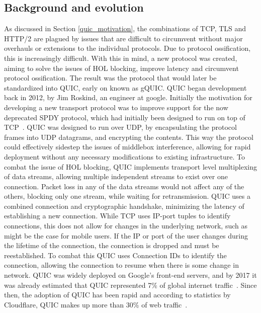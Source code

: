 \documentclass[english, 12pt, a4paper, elec, utf8, a-2b, online]{aaltothesis}
\begin{document}
\subsection{Background and evolution}
As discussed in Section \ref{quic_motivation}, the combinations of TCP, TLS and HTTP/2 are
plagued by issues that are difficult to circumvent without major overhauls or extensions to
the individual protocols. Due to protocol ossification, this is increasingly difficult. With
this in mind, a new protocol was created, aiming to solve the issues of
HOL blocking, improve latency and circumvent protocol ossification. The result
was the protocol that would later be standardized into QUIC, early on known as gQUIC.
QUIC began development back in 2012, by Jim Roskind, an engineer at google. Initially
the motivation for developing a new transport protocol was to improve support for
the now deprecated SPDY protocol, which had initially been designed to run on top
of TCP~\cite{googleQUICDesign}. QUIC was designed to run over
UDP, by encapsulating the protocol frames into UDP datagrams, and encrypting the contents.
This way the protocol could effectively sidestep the issues of middlebox interference, allowing
for rapid deployment without any necessary modifications to existing infrastructure.
To combat the issue of HOL blocking, QUIC implements transport level multiplexing of
data streams, allowing multiple independent streams to exist over one connection.
Packet loss in any of the data streams would not affect any of the others, blocking
only one stream, while waiting for retransmission. QUIC uses a combined connection and
cryptographic handshake, minimizing the latency of establishing a new connection.
While TCP uses IP-port tuples to identify connections, this does not allow for changes in the
underlying network, such as might be the case for mobile users. If the IP or port
of the user changes during the lifetime of the connection,
the connection is dropped and must be reestablished. To combat this QUIC uses
Connection IDs to identify the connection, allowing the connection to resume when
there is some change in network. QUIC was widely deployed on Google's front-end servers,
and by 2017 it was already estimated that QUIC represented 7\% of global internet
traffic~\cite{quic_transport_protocol_design}. Since then, the adoption of QUIC has
been rapid and according to statistics by Cloudflare, QUIC makes up more than 30\% of web traffic~\cite{cloudflare_radar}.
\end{document}
